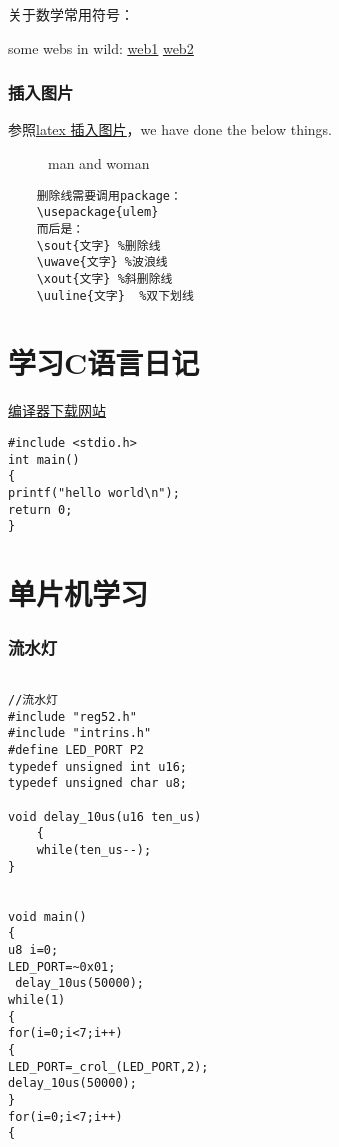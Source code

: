 \documentclass[cn,11pt]{elegantbook}
\begin{document}
关于数学常用符号：

some webs in wild:  
\href{https://blog.csdn.net/Motarookie/article/details/124024409}{\underline{web1}}
\href{https://zhuanlan.zhihu.com/p/95886235}{\underline{web2}}




\subsection{ 插入图片}

参照\href{https://blog.csdn.net/panbaoran913/article/details/122849294?spm=1001.2101.3001.6650.1&utm_medium=distribute.pc\_relevant.none-task-blog-2}
{\underline{latex 插入图片}}，we have done the below things.
    
\begin{figure}[H]%
\centering
{}
\hspace{2mm}
\caption{man and woman}
\end{figure}


\begin{lstlisting}
    删除线需要调用package：
    \usepackage{ulem}
    而后是：
    \sout{文字} %删除线
    \uwave{文字} %波浪线
    \xout{文字} %斜删除线
    \uuline{文字}  %双下划线
\end{lstlisting}



\chapter{学习C语言日记}
      
\href{https://sourceforge.net/projects/mingw-w64/}{\underline{编译器下载网站}}

        

\begin{lstlisting}
#include <stdio.h>
int main()
{ 
printf("hello world\n");
return 0;
}

\end{lstlisting}





\chapter{单片机学习}

\subsection{流水灯}
\begin{lstlisting}

//流水灯
#include "reg52.h"
#include "intrins.h"
#define LED_PORT P2 
typedef unsigned int u16; 
typedef unsigned char u8;

void delay_10us(u16 ten_us)
	{
	while(ten_us--);
}


void main()
{
u8 i=0;
LED_PORT=~0x01;
 delay_10us(50000);
while(1)
{
for(i=0;i<7;i++) 
{
LED_PORT=_crol_(LED_PORT,2);
delay_10us(50000);
}
for(i=0;i<7;i++) 
{

\end{lstlisting}
\end{document}
